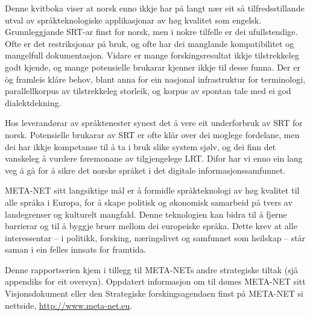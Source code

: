 \begin{multicols}{2}
Denne kvitboka viser at norsk enno ikkje har på langt nær eit så tilfredsstillande utval av språkteknologiske applikasjonar av høg kvalitet som engelsk. Grunnleggjande SRT-ar finst for norsk, men i nokre tilfelle er dei ufullstendige. Ofte er det restriksjonar på bruk, og ofte har dei manglande kompatibilitet og mangelfull dokumentasjon. Vidare er mange forskingsresultat ikkje tilstrekkeleg godt kjende, og mange potensielle brukarar kjenner ikkje til desse funna. Der er òg framleis klåre behov, blant anna for ein nasjonal infrastruktur for terminologi, parallellkorpus av tilstrekkeleg storleik, og korpus av spontan tale med ei god dialektdekning. 

Hos leverandørar av språktenester synest det å vere eit underforbruk av SRT for norsk. 
Potensielle brukarar av SRT er ofte klår over dei moglege fordelane, men dei har ikkje kompetanse til å ta i bruk slike system sjølv, og dei finn det vanskeleg å vurdere føremonane av tilgjengelege LRT. Difor har vi enno ein lang veg å gå for å sikre det norske språket i det digitale informasjonssamfunnet. 

META-NET sitt langsiktige mål er å formidle språkteknologi av høg kvalitet til alle språka i Europa, for å skape politisk og økonomisk samarbeid på tvers av landegrenser og kulturelt mangfald. Denne teknologien kan bidra til å fjerne barrierar og til å byggje bruer mellom dei europeiske språka. Dette krev at alle interessentar – i politikk, forsking, næringslivet og samfunnet som heilskap – står saman i ein felles innsats for framtida.

Denne rapportserien kjem i tillegg til META-NETs andre strategiske tiltak (sjå appendiks for eit oversyn). Oppdatert informasjon om til dømes META-NET sitt Visjonsdokument  \cite{Meta1} eller den Strategiske forskingsagendaen finst på META-NET si nettside, \url{http://www.meta-net.eu}.
\end{multicols}

\clearpage


